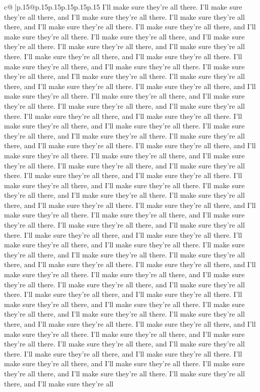 \documentclass{article}
\begin{document}
{\begin{supertabular}{c@{$\;$}|p{.15\linewidth}@{}p{.15\linewidth}p{.15\linewidth}p{.15\linewidth}p{.15\linewidth}p{.15\linewidth}}
{{{I'll make sure they're all there. I'll make sure they're all there, and I'll make sure they're all there. I'll make sure they're all there, and I'll make sure they're all there. I'll make sure they're all there, and I'll make sure they're all there. I'll make sure they're all there, and I'll make sure they're all there. I'll make sure they're all there, and I'll make sure they're all there. I'll make sure they're all there, and I'll make sure they're all there. I'll make sure they're all there, and I'll make sure they're all there. I'll make sure they're all there, and I'll make sure they're all there. I'll make sure they're all there, and I'll make sure they're all there. I'll make sure they're all there, and I'll make sure they're all there. I'll make sure they're all there, and I'll make sure they're all there. I'll make sure they're all there, and I'll make sure they're all there. I'll make sure they're all there, and I'll make sure they're all there. I'll make sure they're all there, and I'll make sure they're all there. I'll make sure they're all there, and I'll make sure they're all there. I'll make sure they're all there, and I'll make sure they're all there. I'll make sure they're all there, and I'll make sure they're all there. I'll make sure they're all there, and I'll make sure they're all there. I'll make sure they're all there, and I'll make sure they're all there. I'll make sure they're all there, and I'll make sure they're all there. I'll make sure they're all there, and I'll make sure they're all there. I'll make sure they're all there, and I'll make sure they're all there. I'll make sure they're all there, and I'll make sure they're all there. I'll make sure they're all there, and I'll make sure they're all there. I'll make sure they're all there, and I'll make sure they're all there. I'll make sure they're all there, and I'll make sure they're all there. I'll make sure they're all there, and I'll make sure they're all there. I'll make sure they're all there, and I'll make sure they're all there. I'll make sure they're all there, and I'll make sure they're all there. I'll make sure they're all there, and I'll make sure they're all there. I'll make sure they're all there, and I'll make sure they're all there. I'll make sure they're all there, and I'll make sure they're all there. I'll make sure they're all there, and I'll make sure they're all there. I'll make sure they're all there, and I'll make sure they're all there. I'll make sure they're all there, and I'll make sure they're all there. I'll make sure they're all there, and I'll make sure they're all there. I'll make sure they're all there, and I'll make sure they're all there. I'll make sure they're all there, and I'll make sure they're all there. I'll make sure they're all there, and I'll make sure they're all there. I'll make sure they're all there, and I'll make sure they're all there. I'll make sure they're all there, and I'll make sure they're all there. I'll make sure they're all there, and I'll make sure they're all there. I'll make sure they're all there, and I'll make sure they're all there. I'll make sure they're all there, and I'll make sure they're all }}}
\end{supertabular}}
\end{document}
